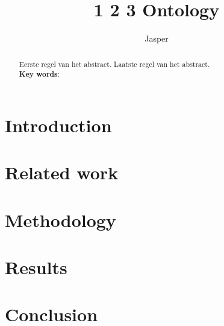 \documentclass[oribibl]{settings/llncs}
\title{1 2 3 Ontology}
\institute{}
\author{Jasper}
\begin{document}
\maketitle

\begin{abstract}
Eerste regel van het abstract.
Laatste regel van het abstract.\\
\textbf{Key words}: 
\end{abstract}

\section{Introduction}

\section{Related work}

\section{Methodology}

\section{Results}

\section{Conclusion}

%

  
\end{document}
